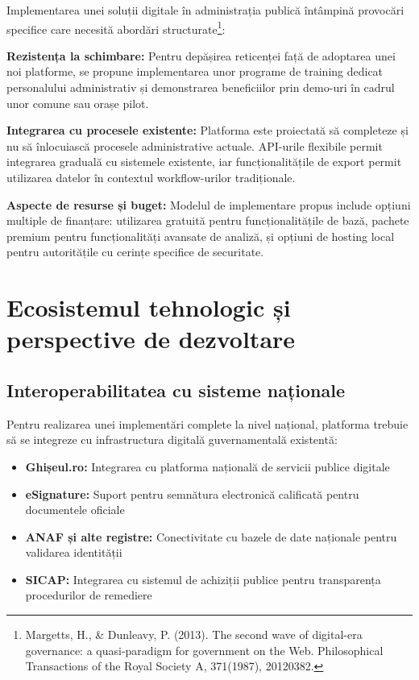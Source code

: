 \documentclass[12pt,a4paper]{report}
\begin{document}
Implementarea unei soluții digitale în administrația publică întâmpină provocări specifice care necesită abordări structurate\footnote{Margetts, H., \& Dunleavy, P. (2013). The second wave of digital-era governance: a quasi-paradigm for government on the Web. Philosophical Transactions of the Royal Society A, 371(1987), 20120382.}:

\textbf{Rezistența la schimbare:} Pentru depășirea reticenței față de adoptarea unei noi platforme, se propune implementarea unor programe de training dedicat personalului administrativ și demonstrarea beneficiilor prin demo-uri în cadrul unor comune sau orașe pilot.

\textbf{Integrarea cu procesele existente:} Platforma este proiectată să completeze și nu să înlocuiască procesele administrative actuale. API-urile flexibile permit integrarea graduală cu sistemele existente, iar funcționalitățile de export permit utilizarea datelor în contextul workflow-urilor tradiționale.

\textbf{Aspecte de resurse și buget:} Modelul de implementare propus include opțiuni multiple de finanțare: utilizarea gratuită pentru funcționalitățile de bază, pachete premium pentru funcționalități avansate de analiză, și opțiuni de hosting local pentru autoritățile cu cerințe specifice de securitate.

\section{Ecosistemul tehnologic și perspective de dezvoltare}   

\subsection{Interoperabilitatea cu sisteme naționale}

Pentru realizarea unei implementări complete la nivel național, platforma trebuie să se integreze cu infrastructura digitală guvernamentală existentă:

\begin{itemize}
\item \textbf{Ghișeul.ro:} Integrarea cu platforma națională de servicii publice digitale
\item \textbf{eSignature:} Suport pentru semnătura electronică calificată pentru documentele oficiale
\item \textbf{ANAF și alte registre:} Conectivitate cu bazele de date naționale pentru validarea identității
\item \textbf{SICAP:} Integrarea cu sistemul de achiziții publice pentru transparența procedurilor de remediere
\end{itemize}
\end{document}
